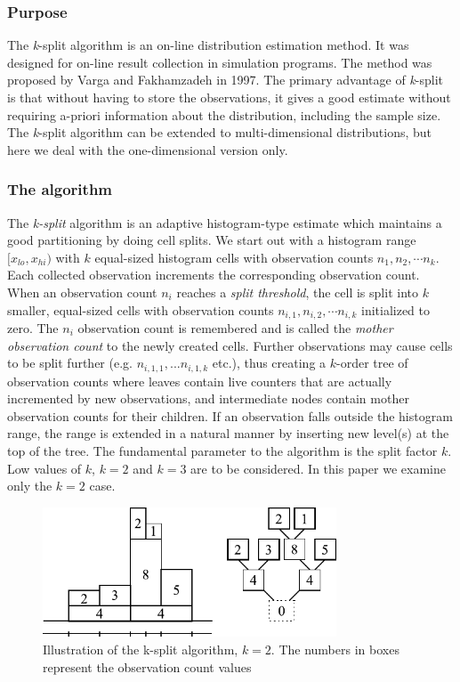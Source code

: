 \subsubsection{Purpose}


The \textit{k}-split algorithm is an on-line distribution
estimation method.  It was
designed for on-line result collection in simulation programs.  The
method was proposed by Varga and Fakhamzadeh in 1997. The primary
advantage of \textit{k}-split is that without having to store the
observations, it gives a good estimate without requiring a-priori
information about the distribution, including the sample size. The
\textit{k}-split algorithm can be extended to multi-dimensional
distributions, but here we deal
with the one-dimensional version only.


\subsubsection{The algorithm}


The \textit{k-split} algorithm is an adaptive histogram-type estimate which
maintains a good partitioning by doing cell splits. We start out with
a histogram range $[x_{lo}, x_{hi})$ with $k$ equal-sized histogram
cells with observation counts $n_1,n_2, \cdots n_k$.  Each collected
observation increments the corresponding observation count. When an
observation count $n_i$ reaches a \textit{split threshold}, the cell
is split into $k$ smaller, equal-sized cells with observation counts
$n_{i,1}, n_{i,2}, \cdots n_{i,k}$ initialized to zero. The $n_i$
observation count is remembered and is called the \textit{mother
  observation count} to the newly created cells. Further observations
may cause cells to be split further (e.g. $n_{i,1,1},...n_{i,1,k}$
etc.), thus creating a $k$-order tree of observation counts where
leaves contain live counters that are actually incremented by new
observations, and intermediate nodes contain mother observation counts
for their children. If an observation falls outside the histogram
range, the range is extended in a natural manner by inserting new
level(s) at the top of the tree. The fundamental parameter to the
algorithm is the split factor $k$. Low values of $k$, $k=2$ and $k=3$
are to be considered. In this paper we examine only the $k=2$ case.

\begin{figure}[htbp]
  \begin{center}
    \includegraphics[width=3.442in, height=1.518in]{figures/usmanFig15}
    \caption{Illustration of the k-split algorithm, $k=2$. The
      numbers in boxes represent the observation count values}
  \end{center}
\end{figure}


